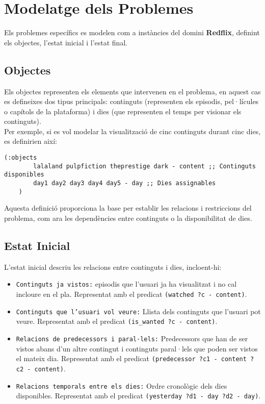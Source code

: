\documentclass[a4paper]{article}
\begin{document}
	\newpage
	\section{Modelatge dels Problemes}
	
	Els problemes específics es modelen com a instàncies del domini \textbf{Redflix}, definint els objectes, l'estat inicial i l'estat final.
	
	\subsection{Objectes}
	
	Els objectes representen els elements que intervenen en el problema, en aquest cas es defineixes dos tipus principals: continguts (representen els episodis, pel·lícules o capítols de la plataforma) i dies (que representen el temps per visionar els continguts). \\
	
	Per exemple, si es vol modelar la visualització de cinc continguts durant cinc dies, es definirien així:
	
	\begin{lstlisting}[language=PDDL, caption={Definició d'objectes}, label={lst:def_objectes}]
	(:objects
		lalaland pulpfiction theprestige dark - content ;; Continguts disponibles
		day1 day2 day3 day4 day5 - day ;; Dies assignables
	)
	\end{lstlisting}
	
	Aquesta definició proporciona la base per establir les relacions i restriccions del problema, com ara les dependències entre continguts o la disponibilitat de dies.
	
	\subsection{Estat Inicial}
	
	L'estat inicial descriu les relacions entre continguts i dies, incloent-hi:
	
	\begin{itemize}
		\item \texttt{Continguts ja vistos:} episodis que l'usuari ja ha visualitzat i no cal incloure en el pla. Representat amb el predicat \texttt{(watched ?c - content)}.
		\item \texttt{Continguts que l'usuari vol veure:} Llista dels continguts que l'usuari pot veure. Representat amb el predicat \texttt{(is\_wanted ?c - content)}.
		\item \texttt{Relacions de predecessors i paral·lels:} Predecessors que han de ser vistos abans d’un altre contingut i continguts paral·lels que poden ser vistos el mateix dia. Representat amb el predicat \texttt{(predecessor ?c1 - content ?c2 - content)}.
		\item \texttt{Relacions temporals entre els dies:} Ordre cronològic dels dies disponibles. Representat amb el predicat \texttt{(yesterday ?d1 - day ?d2 - day)}.
	\end{itemize}
	
\end{document}

